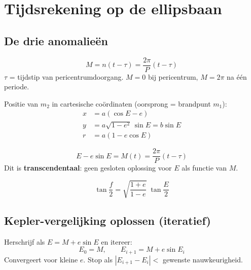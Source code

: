 \documentclass[11pt, a4paper]{article}
\begin{document}
\section{Tijdsrekening op de ellipsbaan}

\subsection{De drie anomalieën}

\begin{formule}
\[
  M = n(t - \tau) = \frac{2\pi}{P}(t - \tau)
\]
$\tau$ = tijdstip van pericentrumdoorgang. $M = 0$ bij pericentrum, $M = 2\pi$ na één periode.
\end{formule}

\begin{formule}
Positie van $m_2$ in cartesische coördinaten (oorsprong = brandpunt $m_1$):
\begin{align}
  x &= a(\cos E - e) \\
  y &= a\sqrt{1-e^2}\,\sin E = b\sin E \\
  r &= a(1 - e\cos E)
\end{align}
\end{formule}

\begin{formule}
\[
  \boxed{E - e\sin E = M(t) = \frac{2\pi}{P}(t - \tau)}
\]
Dit is \textbf{transcendentaal}: geen gesloten oplossing voor $E$ als functie van $M$.
\end{formule}

\begin{formule}
\[
  \tan\frac{f}{2} = \sqrt{\frac{1+e}{1-e}}\;\tan\frac{E}{2}
\]
\end{formule}

\subsection{Kepler-vergelijking oplossen (iteratief)}

\begin{tip}
Herschrijf als $E = M + e\sin E$ en itereer:
\[
  E_0 = M, \qquad E_{i+1} = M + e\sin E_i
\]
Convergeert voor kleine $e$. Stop als $|E_{i+1} - E_i| < $ gewenste nauwkeurigheid.
\end{tip}
\end{document}
